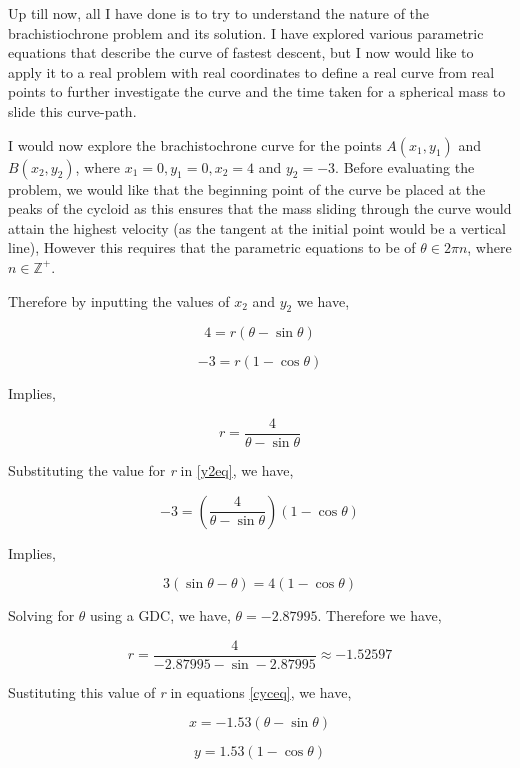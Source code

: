 

{Up till now, all I have done is to try to understand the nature of the brachistiochrone problem and its solution. I have explored various parametric equations that describe the curve of fastest descent, but I now would like to apply it to a real problem with real coordinates to define a real curve from real points to further investigate the curve and the time taken for a spherical mass to slide this curve-path.}

{I would now explore the brachistochrone curve for the points $A(x_{1},y_{1})$ and $B(x_{2},y_{2})$, where $x_{1} = 0, y_{1} = 0, x_{2} = 4$ and $y_{2} = -3$. Before evaluating the problem, we would like that the beginning point of the curve be placed at the peaks of the cycloid as this ensures that the mass sliding through the curve would attain the highest velocity (as the tangent at the initial point would be a vertical line), However this requires that the parametric equations to be of $\theta\in2\pi n$, where $n\in\mathbb{Z}^{+}$.}

{Therefore by inputting the values of $x_{2}$ and $y_{2}$ we have,}

	\begin{equation}
		4 = r\left(\theta - \sin\theta\right)
		\label{x2eq}
	\end{equation}

	\begin{equation}
		-3 = r\left(1 - \cos\theta\right)
		\label{y2eq}
	\end{equation}

{Implies,}

	$$r = \frac{4}{\theta - \sin\theta}$$

{Substituting the value for \textit{r} in \ref{y2eq}, we have,}

	$$-3 = \left(\frac{4}{\theta - \sin\theta}\right)\left(1 - \cos\theta\right)$$

{Implies,}

	$$3\left(\sin\theta - \theta\right) = 4\left(1 - \cos\theta\right)$$

{Solving for $\theta$ using a GDC, we have, $\theta = -2.87995$. Therefore we have,}

	$$r = \frac{4}{-2.87995 - \sin -2.87995} \approx -1.52597$$

{Sustituting this value of \textit{r} in equations \ref{cyceq}, we have,}

	$$x = -1.53\left(\theta - \sin\theta\right)$$

	$$y = 1.53\left(1 - \cos\theta\right)$$

